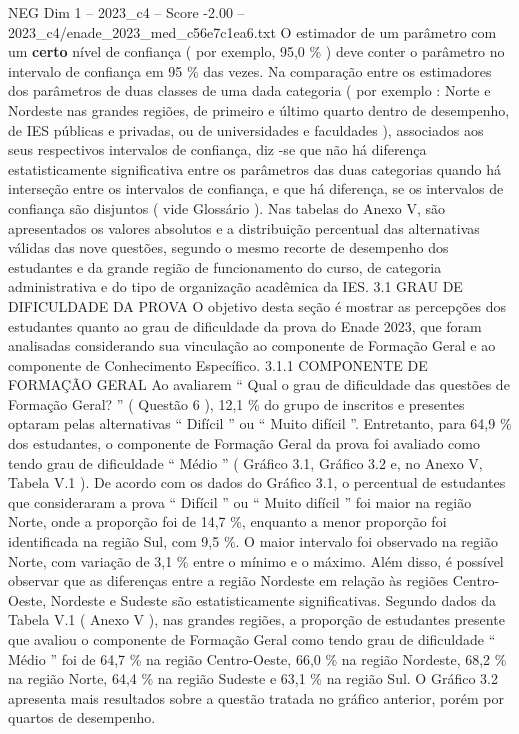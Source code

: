\begin{textsample}{NEG Dim 1 – 2023\_c4 – Score -2.00 – 2023\_c4/enade\_2023\_med\_c56e7c1ea6.txt}
O estimador de um parâmetro com um \textbf{certo} nível de confiança ( por exemplo, 95,0 \% ) deve conter o parâmetro no intervalo de confiança em 95 \% das vezes.
Na comparação entre os estimadores dos parâmetros de duas classes de uma dada categoria ( por exemplo : Norte e Nordeste nas grandes regiões, de primeiro e último quarto dentro de desempenho, de IES públicas e privadas, ou de universidades e faculdades ), associados aos seus respectivos intervalos de confiança, diz -se que não há diferença estatisticamente significativa entre os parâmetros das duas categorias quando há interseção entre os intervalos de confiança, e que há diferença, se os intervalos de confiança são disjuntos ( vide Glossário ).
Nas tabelas do Anexo V, são apresentados os valores absolutos e a distribuição percentual das alternativas válidas das nove questões, segundo o mesmo recorte de desempenho dos estudantes e da grande região de funcionamento do curso, de categoria administrativa e do tipo de organização acadêmica da IES. 3.1 GRAU DE DIFICULDADE DA PROVA O objetivo desta seção é mostrar as percepções dos estudantes quanto ao grau de dificuldade da prova do Enade 2023, que foram analisadas considerando sua vinculação ao componente de Formação Geral e ao componente de Conhecimento Específico. 3.1.1 COMPONENTE DE FORMAÇÃO GERAL Ao avaliarem “ Qual o grau de dificuldade das questões de Formação Geral? ” ( Questão 6 ), 12,1 \% do grupo de inscritos e presentes optaram pelas alternativas “ Difícil ” ou “ Muito difícil ”.
Entretanto, para 64,9 \% dos estudantes, o componente de Formação Geral da prova foi avaliado como tendo grau de dificuldade “ Médio ” ( Gráfico 3.1, Gráfico 3.2 e, no Anexo V, Tabela V.1 ).
De acordo com os dados do Gráfico 3.1, o percentual de estudantes que consideraram a prova “ Difícil ” ou “ Muito difícil ” foi maior na região Norte, onde a proporção foi de 14,7 \%, enquanto a menor proporção foi identificada na região Sul, com 9,5 \%.
O maior intervalo foi observado na região Norte, com variação de 3,1 \% entre o mínimo e o máximo.
Além disso, é possível observar que as diferenças entre a região Nordeste em relação às regiões Centro-Oeste, Nordeste e Sudeste são estatisticamente significativas.
Segundo dados da Tabela V.1 ( Anexo V ), nas grandes regiões, a proporção de estudantes presente que avaliou o componente de Formação Geral como tendo grau de dificuldade “ Médio ” foi de 64,7 \% na região Centro-Oeste, 66,0 \% na região Nordeste, 68,2 \% na região Norte, 64,4 \% na região Sudeste e 63,1 \% na região Sul.
O Gráfico 3.2 apresenta mais resultados sobre a questão tratada no gráfico anterior, porém por quartos de desempenho.

\end{textsample}

